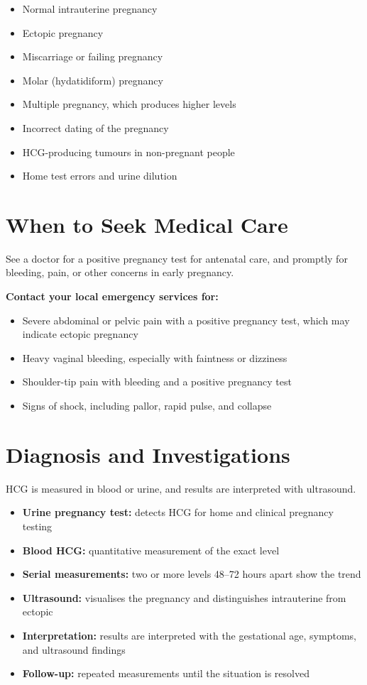 \begin{itemize}
    \item Normal intrauterine pregnancy
    \item Ectopic pregnancy
    \item Miscarriage or failing pregnancy
    \item Molar (hydatidiform) pregnancy
    \item Multiple pregnancy, which produces higher levels
    \item Incorrect dating of the pregnancy
    \item HCG-producing tumours in non-pregnant people
    \item Home test errors and urine dilution
\end{itemize}

\section*{When to Seek Medical Care}
See a doctor for a positive pregnancy test for antenatal care, and promptly for bleeding, pain, or other concerns in early pregnancy.

\textbf{Contact your local emergency services for:}
\begin{itemize}
    \item Severe abdominal or pelvic pain with a positive pregnancy test, which may indicate ectopic pregnancy
    \item Heavy vaginal bleeding, especially with faintness or dizziness
    \item Shoulder-tip pain with bleeding and a positive pregnancy test
    \item Signs of shock, including pallor, rapid pulse, and collapse
\end{itemize}

\section*{Diagnosis and Investigations}
HCG is measured in blood or urine, and results are interpreted with ultrasound.

\begin{itemize}
    \item \textbf{Urine pregnancy test:} detects HCG for home and clinical pregnancy testing
    \item \textbf{Blood HCG:} quantitative measurement of the exact level
    \item \textbf{Serial measurements:} two or more levels 48--72 hours apart show the trend
    \item \textbf{Ultrasound:} visualises the pregnancy and distinguishes intrauterine from ectopic
    \item \textbf{Interpretation:} results are interpreted with the gestational age, symptoms, and ultrasound findings
    \item \textbf{Follow-up:} repeated measurements until the situation is resolved
\end{itemize}

